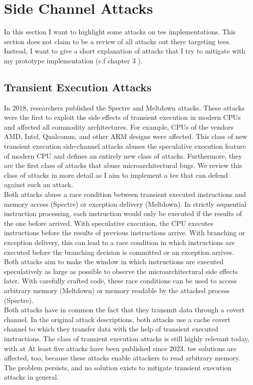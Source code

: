 \section{Side Channel Attacks}
\label{sec:20:attacks}
In this section I want to highlight some attacks on \gls{tee} implementations.
This section does not claim to be a review of all attacks out there targeting
\glspl{tee}. Instead, I want to give a short explanation of attacks that I try
to mitigate with my prototype implementation (c.f chapter 3 ).

\subsection{Transient Execution Attacks}
\label{sec:20:transientattacks}
In 2018, researchers published the Spectre and Meltdown
attacks.\cite{kocher_spectre_2020, lipp_meltdown_2020} These attacks were the
first to exploit the side effects of transient execution in modern CPUs and
affected all commodity architectures. For example, CPUs of the vendors AMD,
Intel, Qualcomm, and other ARM designs were affected. This class of new
transient execution side-channel attacks abuses the speculative execution
feature of modern CPU and defines an entirely new class of attacks. Furthermore,
they are the first class of attacks that abuse microarchitectural bugs. We
review this class of attacks in more detail as I aim to implement a \gls{tee}
that can defend against such an attack.\\

Both attacks abuse a race condition between transient executed instructions and
memory access (Spectre) or exception delivery (Meltdown). In strictly sequential
instruction processing, each instruction would only be executed if the results
of the one before arrived. With speculative execution, the CPU executes
instructions before the results of previous instructions arrive. With branching
or exception delivery, this can lead to a race condition in which instructions
are executed before the branching decision is committed or an exception arrives.
Both attacks aim to make the window in which instructions are executed
speculatively as large as possible to observe the microarchitectural side
effects later. With carefully crafted code, these race conditions can be used to
access arbitrary memory (Meltdown) or memory readable by the attacked process
(Spectre). \\

Both attacks have in common the fact that they transmit data through a covert
channel. In the original attack descriptions, both attacks use a cache covert
channel to which they transfer data with the help of transient executed
instructions. The class of transient execution attacks is still highly relevant
today, with at At least five attacks have been published since 2023.
\cite{ormandy2023zenbleed,trujillo2023inception, moghimi2023downfall,ragab_ghostrace_2024, wilke2024tdxdown}
\gls{tee} solutions are affected, too, because these attacks enable attackers to
read arbitrary memory. The problem persists, and no solution exists to mitigate
transient execution attacks in general.\\

